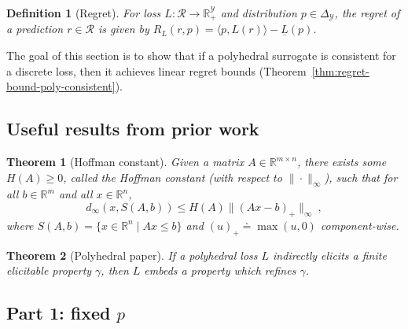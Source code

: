 \documentclass[12pt]{article}
\newcommand{\reals}{\mathbb{R}}
\newcommand{\defeq}{\doteq}%
\newcommand{\simplex}{\Delta_\Y}
\newcommand{\R}{\mathcal{R}}
\newcommand{\Y}{\mathcal{Y}}
\newcommand{\risk}[1]{\underline{#1}}
\newcommand{\inprod}[2]{\langle #1, #2 \rangle}%
\newtheorem{theorem}{Theorem}
\newtheorem{definition}{Definition}
\begin{document}
\begin{definition}[Regret]\label{def:regret}
  For loss $L:\R\to\reals^\Y_+$ and distribution $p\in\simplex$, the \emph{regret} of a prediction $r\in\R$ is given by $R_L(r,p) = \inprod{p}{L(r)} - \risk{L}(p)$.
\end{definition}

The goal of this section is to show that if a polyhedral surrogate is consistent for a discrete loss, then it achieves linear regret bounds (Theorem~\ref{thm:regret-bound-poly-consistent}).

\subsection{Useful results from prior work}

\begin{theorem}[Hoffman constant]
  \label{thm:hoffman}
  Given a matrix $A\in\reals^{m\times n}$, there exists some $H(A)\geq 0$, called the \emph{Hoffman constant} (with respect to $\|\cdot\|_\infty$), such that for all $b\in\reals^m$ and all $x\in\reals^n$,
  \begin{equation}
    \label{eq:hoffman}
    d_\infty(x,S(A,b)) \leq H(A) \|(A x - b)_+\|_\infty~,
  \end{equation}
  where $S(A,b) = \{x\in\reals^n \mid A x \leq b\}$ and $(u)_+ \defeq \max(u,0)$ component-wise.
\end{theorem}

\begin{theorem}[Polyhedral paper]
  \label{thm:poly-embed-refine}
  If a polyhedral loss $L$ indirectly elicits a finite elicitable property $\gamma$, then $L$ embeds a property which refines $\gamma$.
\end{theorem}

\subsection{Part 1: fixed $p$}
\end{document}
